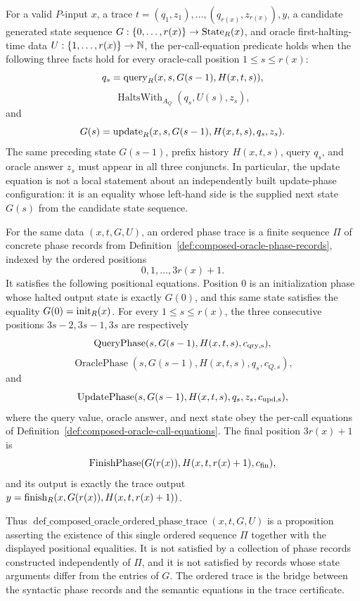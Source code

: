 \begin{definition}
  \label{def:composed-oracle-call-equations}
  For a valid $P$-input $x$, a trace
  $t=(q_1,z_1),\ldots,(q_{r(x)},z_{r(x)}),y$, a candidate generated state
  sequence $G:\{0,\ldots,r(x)\}\to\operatorname{State}_R(x)$, and oracle first-halting-time
  data $U:\{1,\ldots,r(x)\}\to\mathbb{N}$, the per-call-equation predicate holds when
  the following three facts hold for every oracle-call position
  $1\leq s\leq r(x)$:
  \[
    q_s=\operatorname{query}_R(x,s,G(s-1),H(x,t,s)),
  \]
  \[
    \operatorname{HaltsWith}_{A_Q}(q_s,U(s),z_s),
  \]
  and
  \[
    G(s)=\operatorname{update}_R(x,s,G(s-1),H(x,t,s),q_s,z_s).
  \]
  The same preceding state $G(s-1)$, prefix history $H(x,t,s)$, query $q_s$,
  and oracle answer $z_s$ must appear in all three conjuncts.  In particular,
  the update equation is not a local statement about an independently built
  update-phase configuration: it is an equality whose left-hand side is the
  supplied next state $G(s)$ from the candidate state sequence.
\end{definition}

\begin{definition}
  \label{def:composed-oracle-ordered-phase-trace}
  For the same data $(x,t,G,U)$, an ordered phase trace is a finite sequence
  $\Pi$ of concrete phase records from
  Definition~\ref{def:composed-oracle-phase-records}, indexed by the ordered
  positions
  \[
    0,1,\ldots,3r(x)+1.
  \]
  It satisfies the following positional equations.  Position $0$ is an
  initialization phase whose halted output state is exactly $G(0)$, and this
  same state satisfies the equality $G(0)=\operatorname{init}_R(x)$.  For every
  $1\leq s\leq r(x)$, the three consecutive positions
  $3s-2,3s-1,3s$ are respectively
  \[
    \operatorname{QueryPhase}(s,G(s-1),H(x,t,s),c_{\rm qry,s}),
  \]
  \[
    \operatorname{OraclePhase}(s,G(s-1),H(x,t,s),q_s,c_{Q,s}),
  \]
  and
  \[
    \operatorname{UpdatePhase}(s,G(s-1),H(x,t,s),q_s,z_s,c_{\rm upd,s}),
  \]
  where the query value, oracle answer, and next state obey the per-call
  equations of Definition~\ref{def:composed-oracle-call-equations}.  The final
  position $3r(x)+1$ is
  \[
    \operatorname{FinishPhase}(G(r(x)),H(x,t,r(x)+1),c_{\rm fin}),
  \]
  and its output is exactly the trace output
  $y=\operatorname{finish}_R(x,G(r(x)),H(x,t,r(x)+1))$.

  Thus
  $\operatorname{def\_composed\_oracle\_ordered\_phase\_trace}(x,t,G,U)$ is a
  proposition asserting the existence of this single ordered sequence $\Pi$
  together with the displayed positional equalities.  It is not satisfied by a
  collection of phase records constructed independently of $\Pi$, and it is not
  satisfied by records whose state arguments differ from the entries of $G$.
  The ordered trace is the bridge between the syntactic phase records and the
  semantic equations in the trace certificate.
\end{definition}

